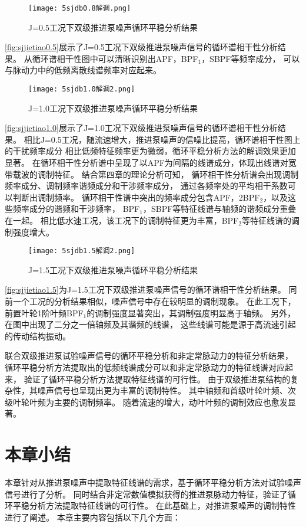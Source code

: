 \begin{figure}[htbp]
    \centering
    \texttt{[image: 5sjdb0.8解调.png]}
    \caption{\label{fig:sjjietiao0.5}J=0.5工况下双级推进泵噪声循环平稳分析结果}
\end{figure}
\autoref{fig:sjjietiao0.5}展示了J=0.5工况下双级推进泵噪声信号的循环谱相干性分析结果。
从循环谱相干性图中可以清晰识别出APF，BPF$_1$，SBPF等频率成分，
可以与脉动力中的低频离散线谱频率对应起来。
\begin{comment}
\end{comment}
\begin{figure}[htbp]
    \centering
    \texttt{[image: 5sjdb1.0解调2.png]}
    \caption{\label{fig:sjjietiao1.0}J=1.0工况下双级推进泵噪声循环平稳分析结果}
\end{figure}

\autoref{fig:sjjietiao1.0}展示了J=1.0工况下双级推进泵噪声信号的循环谱相干性分析结果。
相比J=0.5工况，随流速增大，推进泵噪声的信噪比提高，循环谱相干性图上的干扰频率成分
相比低频特征频率更为微弱，循环平稳分析方法的解调效果更加显著。
在循环相干性分析谱中呈现了以APF为间隔的线谱成分，体现出线谱对宽带载波的调制特征。
结合第四章的理论分析可知，
循环相干性分析谱会出现调制频率成分、调制频率谐频成分和干涉频率成分，
通过各频率处的平均相干系数可以判断出调制频率。
循环相干性谱中突出的频率成分包含APF，2BPF$_2$，以及这些频率成分的谐频和干涉频率，
BPF$_1$，SBPF等特征线谱与轴频的谐频成分重叠在一起。
相比低水速工况，该工况下的调制特征更为丰富，BPF$_2$等特征线谱的调制强度增大。
\begin{figure}[htbp]
    \centering
    \texttt{[image: 5sjdb1.5解调2.png]}
    \caption{\label{fig:sjjietiao1.5}J=1.5工况下双级推进泵噪声循环平稳分析结果}
\end{figure}

\autoref{fig:sjjietiao1.5}为J=1.5工况下双级推进泵噪声信号的循环谱相干性分析结果。
同前一个工况的分析结果相似，噪声信号中存在较明显的调制现象。
在此工况下，前置叶轮1阶叶频BPF$_1$的调制强度显著突出，其调制强度明显高于轴频。
另外，在图中出现了二分之一倍轴频及其谐频的线谱，
这些线谱可能是源于高流速引起的传动结构振动。

联合双级推进泵试验噪声信号的循环平稳分析和非定常脉动力的特征分析结果，
循环平稳分析方法提取出的低频线谱成分可以和非定常脉动力的特征线谱对应起来，
验证了循环平稳分析方法提取特征线谱的可行性。
由于双级推进泵结构的复杂性，其噪声信号也呈现出更为丰富的调制特性。
其中轴频和首级叶轮叶频、次级叶轮叶频为主要的调制频率。
随着流速的增大，动叶叶频的调制效应也愈发显著。
\section{本章小结}
本章针对从推进泵噪声中提取特征线谱的需求，基于循环平稳分析方法对试验噪声信号进行了分析。
同时结合非定常数值模拟获得的推进泵脉动力特征，验证了循环平稳分析方法提取特征线谱的可行性。
在此基础上，对推进泵噪声的调制特性进行了阐述。
本章主要内容包括以下几个方面：

